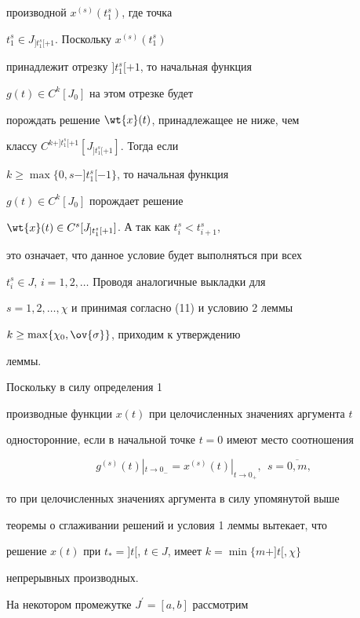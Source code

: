 производной $x^{(s)}(t_1^s)$, где точка 


$t_1^s\in J_{]t_1^s[+1}$. Поскольку $x^{(s)}(t_1^s)$ 


принадлежит  отрезку $]t_1^s[+1$, то начальная функция 


$g(t)\in C^k[J_0]$ на этом отрезке будет


порождать решение $\wt{x}(t)$, принадлежащее не ниже, чем


классу $C^{k+]t_1^s[+1}[J_{]t_1^s[+1}]$. Тогда если 


$k\geq \max\{0,s-]t_1^s[-1\}$, то начальная функция


$g(t)\in C^k[J_0]$ порождает решение 


$\wt{x}(t)\in C^s[J_{]t_1^s[+1}]$. А так как $t_i^s<t_{i+1}^s$,


это означает, что данное условие будет выполняться при всех


$t_i^s\in J$, $i=1,2,\dotsc$ Проводя аналогичные выкладки для


$s=1,2,\dotsc,\chi$ и принимая согласно (11) и условию 2 леммы


$k \geq \max \{ \chi_0,\ov{\sigma}\}$, приходим к утверждению 


леммы.





\begin{cor}


Поскольку в силу определения 1 


производные функции $x(t)$ при целочисленных значениях аргумента $t$ 


односторонние, если в начальной точке $t=0$ имеют место соотношения


$$


g^{(s)}(t)|_{t\to 0_{-}}=


x^{(s)}(t)|_{t\to 0_{+}},\ \ s=\overline{0,m},


$$


то при целочисленных значениях аргумента в силу упомянутой выше


теоремы о сглаживании решений и условия 1 леммы вытекает, что


решение $x(t)$ при $t_*=]t[$, $t\in J$, имеет $k=\min \{m+]t[,\chi\}$


непрерывных производных.


\end{cor}





На некотором промежутке $J^\prime =[a,b]$ рассмотрим


